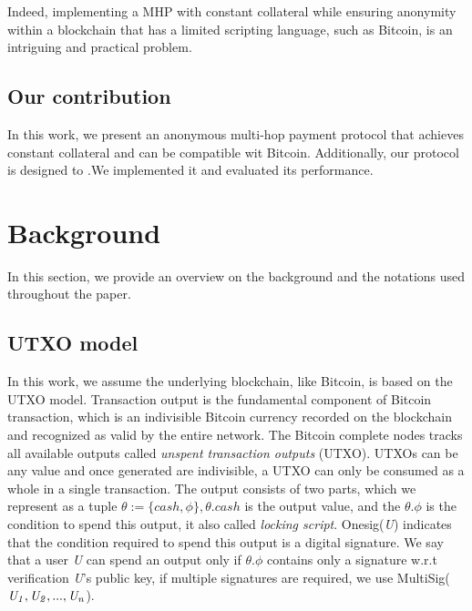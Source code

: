 \documentclass[conference]{IEEEtran}
\begin{document}
Indeed, implementing a MHP with constant collateral while ensuring anonymity within a blockchain that has a limited scripting language, 
such as Bitcoin, is an intriguing and practical problem.

\subsection{Our contribution}
In this work, we present an anonymous multi-hop payment protocol that achieves constant collateral and can be compatible wit Bitcoin. 
Additionally, our protocol is designed to .We implemented it and evaluated its performance.

\section{Background}
In this section, we provide an overview on the background and the notations used throughout the paper.

\subsection{UTXO model}
In this work, we assume the underlying blockchain, like Bitcoin, is based on the UTXO model. Transaction output is 
the fundamental component of Bitcoin transaction, which is an indivisible Bitcoin currency recorded on the blockchain 
and recognized as valid by the entire network. The Bitcoin complete nodes tracks all available outputs called 
\emph{unspent transaction outputs} (UTXO). UTXOs can be any value and once generated are indivisible, a UTXO can only 
be consumed as a whole in a single transaction. The output consists of two parts, which we represent as a 
tuple $\theta :=\{cash,\phi\}, \theta.cash$ is the output value, and the $\theta.\phi$ is the condition to spend 
this output, it also called \emph{locking script}. Onesig(\emph{U}) indicates that the condition required to 
spend this output is a digital signature. We say that a user \emph{U} can spend an output only if $\theta.\phi$ 
contains only a signature w.r.t verification  \emph{U}'s public key, if multiple signatures are required, we use 
MultiSig($\it U_1,U_2,...,U_n$).
\end{document}
